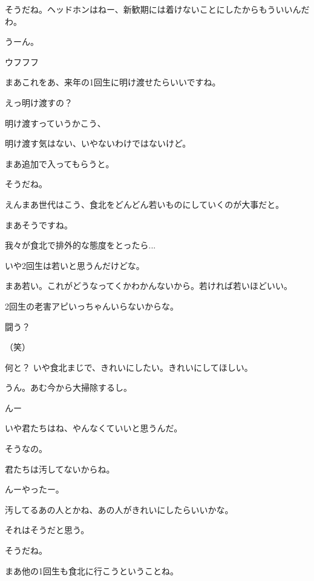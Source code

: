 \begin{multicols}{3}
{        そうだね。ヘッドホンはねー、新歓期には着けないことにしたからもういいんだわ。

        うーん。

        ウフフフ

        まあこれをあ、来年の1回生に明け渡せたらいいですね。

        えっ明け渡すの？

        明け渡すっていうかこう、

        明け渡す気はない、いやないわけではないけど。

        まあ追加で入ってもらうと。

        そうだね。

        えんまあ世代はこう、食北をどんどん若いものにしていくのが大事だと。

        まあそうですね。

        我々が食北で排外的な態度をとったら...

        いや2回生は若いと思うんだけどな。

        まあ若い。これがどうなってくかわかんないから。若ければ若いほどいい。

        2回生の老害アピいっちゃんいらないからな。

        闘う？

        （笑）

        何と？ いや食北まじで、きれいにしたい。きれいにしてほしい。

        うん。あむ今から大掃除するし。

        んー

        いや君たちはね、やんなくていいと思うんだ。

        そうなの。

        君たちは汚してないからね。

        んーやったー。

        汚してるあの人とかね、あの人がきれいにしたらいいかな。

        それはそうだと思う。

        そうだね。

        まあ他の1回生も食北に行こうということね。

}
\end{multicols}
